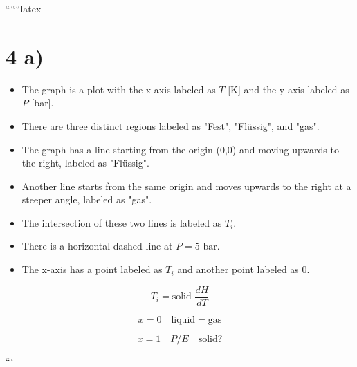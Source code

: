 
``````latex


\section*{4 a)}

\begin{itemize}
    \item The graph is a plot with the x-axis labeled as $T$ [\textdegree K] and the y-axis labeled as $P$ [bar].
    \item There are three distinct regions labeled as "Fest", "Flüssig", and "gas".
    \item The graph has a line starting from the origin (0,0) and moving upwards to the right, labeled as "Flüssig".
    \item Another line starts from the same origin and moves upwards to the right at a steeper angle, labeled as "gas".
    \item The intersection of these two lines is labeled as $T_i$.
    \item There is a horizontal dashed line at $P = 5 \text{ bar}$.
    \item The x-axis has a point labeled as $T_i$ and another point labeled as $0$.
\end{itemize}

\[
T_i = \text{solid } \frac{dH}{dT}
\]

\[
x = 0 \quad \text{liquid} = \text{gas}
\]

\[
x = 1 \quad P/E \quad \text{solid?}
\]

```